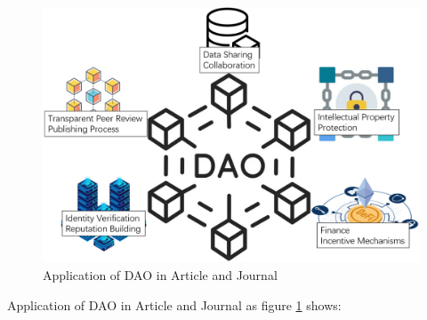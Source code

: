 \documentclass[lettersize,journal]{IEEEtran}
\begin{document}
\begin{figure}[h]
  \centering
  \includegraphics[width=\linewidth]{assets/dao.png}
  \caption{Application of DAO in Article and Journal}
  \label{fig:applicationofdao}
\end{figure}


Application of DAO in Article and Journal as figure \ref{fig:applicationofdao} shows:
\end{document}

